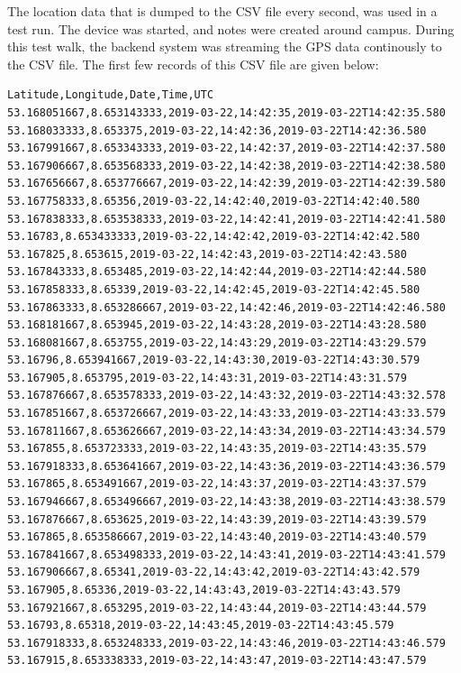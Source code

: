 The location data that is dumped to the CSV file every second, was used in a test run. The device was started, and notes were created around campus. During this test walk, the backend system was streaming the GPS data continously to the CSV file. The first few records of this CSV file are given below:\\

\begin{verbatim}
Latitude,Longitude,Date,Time,UTC
53.168051667,8.653143333,2019-03-22,14:42:35,2019-03-22T14:42:35.580
53.168033333,8.653375,2019-03-22,14:42:36,2019-03-22T14:42:36.580
53.167991667,8.653343333,2019-03-22,14:42:37,2019-03-22T14:42:37.580
53.167906667,8.653568333,2019-03-22,14:42:38,2019-03-22T14:42:38.580
53.167656667,8.653776667,2019-03-22,14:42:39,2019-03-22T14:42:39.580
53.167758333,8.65356,2019-03-22,14:42:40,2019-03-22T14:42:40.580
53.167838333,8.653538333,2019-03-22,14:42:41,2019-03-22T14:42:41.580
53.16783,8.653433333,2019-03-22,14:42:42,2019-03-22T14:42:42.580
53.167825,8.653615,2019-03-22,14:42:43,2019-03-22T14:42:43.580
53.167843333,8.653485,2019-03-22,14:42:44,2019-03-22T14:42:44.580
53.167858333,8.65339,2019-03-22,14:42:45,2019-03-22T14:42:45.580
53.167863333,8.653286667,2019-03-22,14:42:46,2019-03-22T14:42:46.580
53.168181667,8.653945,2019-03-22,14:43:28,2019-03-22T14:43:28.580
53.168081667,8.653755,2019-03-22,14:43:29,2019-03-22T14:43:29.579
53.16796,8.653941667,2019-03-22,14:43:30,2019-03-22T14:43:30.579
53.167905,8.653795,2019-03-22,14:43:31,2019-03-22T14:43:31.579
53.167876667,8.653578333,2019-03-22,14:43:32,2019-03-22T14:43:32.578
53.167851667,8.653726667,2019-03-22,14:43:33,2019-03-22T14:43:33.579
53.167811667,8.653626667,2019-03-22,14:43:34,2019-03-22T14:43:34.579
53.167855,8.653723333,2019-03-22,14:43:35,2019-03-22T14:43:35.579
53.167918333,8.653641667,2019-03-22,14:43:36,2019-03-22T14:43:36.579
53.167865,8.653491667,2019-03-22,14:43:37,2019-03-22T14:43:37.579
53.167946667,8.653496667,2019-03-22,14:43:38,2019-03-22T14:43:38.579
53.167876667,8.653625,2019-03-22,14:43:39,2019-03-22T14:43:39.579
53.167865,8.653586667,2019-03-22,14:43:40,2019-03-22T14:43:40.579
53.167841667,8.653498333,2019-03-22,14:43:41,2019-03-22T14:43:41.579
53.167906667,8.65341,2019-03-22,14:43:42,2019-03-22T14:43:42.579
53.167905,8.65336,2019-03-22,14:43:43,2019-03-22T14:43:43.579
53.167921667,8.653295,2019-03-22,14:43:44,2019-03-22T14:43:44.579
53.16793,8.65318,2019-03-22,14:43:45,2019-03-22T14:43:45.579
53.167918333,8.653248333,2019-03-22,14:43:46,2019-03-22T14:43:46.579
53.167915,8.653338333,2019-03-22,14:43:47,2019-03-22T14:43:47.579

\end{verbatim}
